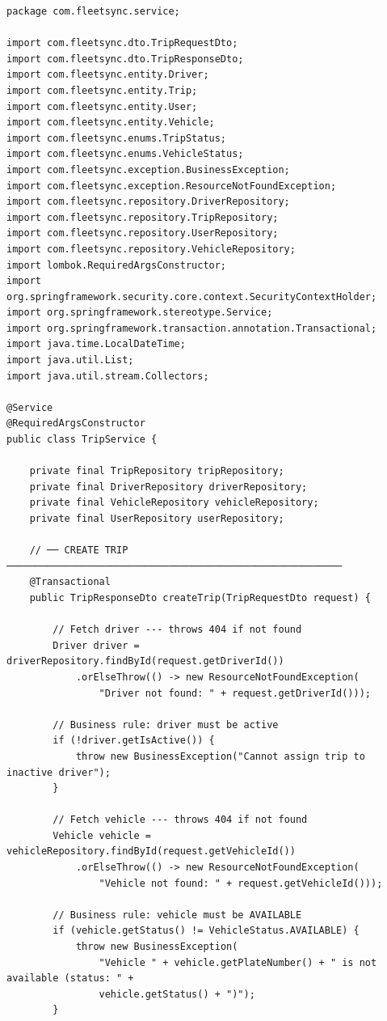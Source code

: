 \documentclass[12pt,a4paper]{report}
\begin{document}
\begin{lstlisting}[caption=TripService.java -- Full Business Logic]
package com.fleetsync.service;

import com.fleetsync.dto.TripRequestDto;
import com.fleetsync.dto.TripResponseDto;
import com.fleetsync.entity.Driver;
import com.fleetsync.entity.Trip;
import com.fleetsync.entity.User;
import com.fleetsync.entity.Vehicle;
import com.fleetsync.enums.TripStatus;
import com.fleetsync.enums.VehicleStatus;
import com.fleetsync.exception.BusinessException;
import com.fleetsync.exception.ResourceNotFoundException;
import com.fleetsync.repository.DriverRepository;
import com.fleetsync.repository.TripRepository;
import com.fleetsync.repository.UserRepository;
import com.fleetsync.repository.VehicleRepository;
import lombok.RequiredArgsConstructor;
import org.springframework.security.core.context.SecurityContextHolder;
import org.springframework.stereotype.Service;
import org.springframework.transaction.annotation.Transactional;
import java.time.LocalDateTime;
import java.util.List;
import java.util.stream.Collectors;

@Service
@RequiredArgsConstructor
public class TripService {

    private final TripRepository tripRepository;
    private final DriverRepository driverRepository;
    private final VehicleRepository vehicleRepository;
    private final UserRepository userRepository;

    // ── CREATE TRIP ──────────────────────────────────────────────────────────
    @Transactional
    public TripResponseDto createTrip(TripRequestDto request) {

        // Fetch driver --- throws 404 if not found
        Driver driver = driverRepository.findById(request.getDriverId())
            .orElseThrow(() -> new ResourceNotFoundException(
                "Driver not found: " + request.getDriverId()));

        // Business rule: driver must be active
        if (!driver.getIsActive()) {
            throw new BusinessException("Cannot assign trip to inactive driver");
        }

        // Fetch vehicle --- throws 404 if not found
        Vehicle vehicle = vehicleRepository.findById(request.getVehicleId())
            .orElseThrow(() -> new ResourceNotFoundException(
                "Vehicle not found: " + request.getVehicleId()));

        // Business rule: vehicle must be AVAILABLE
        if (vehicle.getStatus() != VehicleStatus.AVAILABLE) {
            throw new BusinessException(
                "Vehicle " + vehicle.getPlateNumber() + " is not available (status: " +
                vehicle.getStatus() + ")");
        }


\end{lstlisting}
\end{document}
